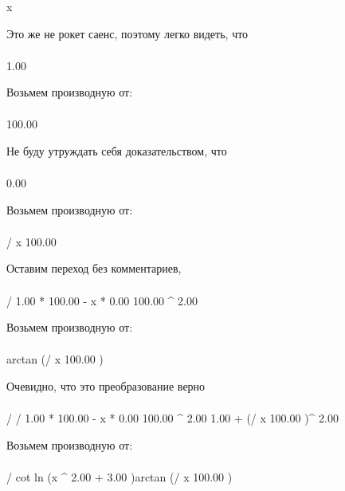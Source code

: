\begin{}
x \\
\end{}
Это же не рокет саенс, поэтому легко видеть, что
\begin{gather}
\end{gather}
\begin{}
1.00 \\
\end{}
Возьмем производную от:
\begin{gather}
\end{gather}
\begin{}
100.00 \\
\end{}
Не буду утруждать себя доказательством, что
\begin{gather}
\end{gather}
\begin{}
0.00 \\
\end{}
Возьмем производную от:
\begin{gather}
\end{gather}
\begin{}
/ {x }{100.00 }\\
\end{}
Оставим переход без комментариев, 
\begin{gather}
\end{gather}
\begin{}
/ {1.00 * 100.00 - x * 0.00 }{100.00 ^ {2.00 }}\\
\end{}
Возьмем производную от:
\begin{gather}
\end{gather}
\begin{}
arctan (/ {x }{100.00 })\\
\end{}
Очевидно, что это преобразование верно
\begin{gather}
\end{gather}
\begin{}
/ {/ {1.00 * 100.00 - x * 0.00 }{100.00 ^ {2.00 }}}{1.00 + (/ {x }{100.00 })^ {2.00 }}\\
\end{}
Возьмем производную от:
\begin{gather}
\end{gather}
\begin{}
/ {cot ln (x ^ {2.00 }+ 3.00 )}{arctan (/ {x }{100.00 })}\\
\end{}
